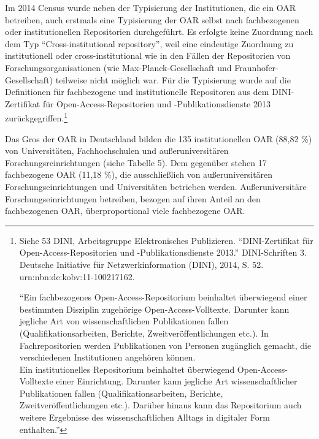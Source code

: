 \documentclass[a4paper,
fontsize=11pt,
oneside,
numbers=noperiodatend,
parskip=half-,
bibliography=totoc,
final
]{scrartcl}
\begin{document}
Im 2014 Census wurde neben der Typisierung der Institutionen, die ein
OAR betreiben, auch erstmals eine Typisierung der OAR selbst nach
fachbezogenen oder institutionellen Repositorien durchgeführt. Es
erfolgte keine Zuordnung nach dem Typ \enquote{Cross-institutional
repository}, weil eine eindeutige Zuordnung zu institutionell oder
cross-institutional wie in den Fällen der Repositorien von
Forschungsorganisationen (wie Max-Planck-Gesellschaft und
Fraunhofer-Gesellschaft) teilweise nicht möglich war. Für die
Typisierung wurde auf die Definitionen für fachbezogene und
institutionelle Repositoren aus dem DINI-Zertifikat für
Open-Access-Repositorien und -Publikationsdienste 2013
zurückgegriffen.\footnote{Siehe 53 DINI, Arbeitsgruppe Elektronisches
  Publizieren. \enquote{DINI-Zertifikat für Open-Access-Repositorien und
  -Publikationsdienste 2013.} DINI-Schriften 3. Deutsche Initiative für
  Netzwerkinformation (DINI), 2014, S. 52. urn:nbn:de:kobv:11-100217162.

  \enquote{Ein fachbezogenes Open-Access-Repositorium beinhaltet
  überwiegend einer bestimmten Disziplin zugehörige
  Open-Access-Volltexte. Darunter kann jegliche Art von
  wissenschaftlichen Publikationen fallen (Qualifikationsarbeiten,
  Berichte, Zweitveröffentlichungen etc.). In Fachrepositorien werden
  Publikationen von Personen zugänglich gemacht, die verschiedenen
  Institutionen angehören können.\\Ein institutionelles Repositorium
  beinhaltet überwiegend Open-Access-Volltexte einer Einrichtung.
  Darunter kann jegliche Art wissenschaftlicher Publikationen fallen
  (Qualifikationsarbeiten, Berichte, Zweitveröffentlichungen etc.).
  Darüber hinaus kann das Repositorium auch weitere Ergebnisse des
  wissenschaftlichen Alltags in digitaler Form enthalten.}}

Das Gros der OAR in Deutschland bilden die 135 institutionellen OAR
(88,82 \%) von Universitäten, Fachhochschulen und außeruniversitären
Forschungsreinrichtungen (siehe Tabelle 5). Dem gegenüber stehen 17
fachbezogene OAR (11,18 \%), die ausschließlich von außeruniversitären
Forschungseinrichtungen und Universitäten betrieben werden.
Außeruniversitäre Forschungseinrichtungen betreiben, bezogen auf ihren
Anteil an den fachbezogenen OAR, überproportional viele fachbezogene
OAR.
\end{document}
